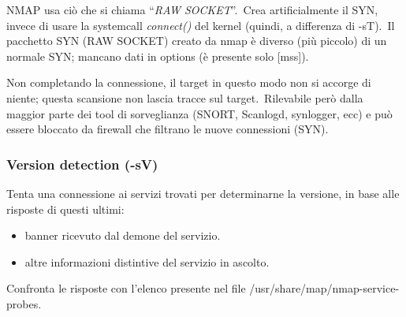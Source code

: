 NMAP usa ciò che si chiama ``\emph{RAW SOCKET}''.\
Crea artificialmente il SYN, invece di usare la systemcall \emph{connect()} del kernel (quindi, a differenza di -sT).\
Il pacchetto SYN (RAW SOCKET) creato da nmap è diverso (più piccolo) di un normale SYN; mancano dati in options (è
presente solo [mss]).

Non completando la connessione, il target in questo modo non si accorge di niente; questa scansione non lascia tracce sul target.\
Rilevabile però dalla maggior parte dei tool di sorveglianza (SNORT, Scanlogd, synlogger, ecc) e può essere bloccato da firewall che filtrano le nuove connessioni (SYN).

\subsubsection{Version detection (-sV)}

Tenta una connessione ai servizi trovati per determinarne la versione, in base alle risposte di questi ultimi:
\begin{itemize}
    \item banner ricevuto dal demone del servizio.
    \item altre informazioni distintive del servizio in ascolto.
\end{itemize}
Confronta le risposte con l’elenco presente nel file /usr/share/map/nmap-service-probes.

